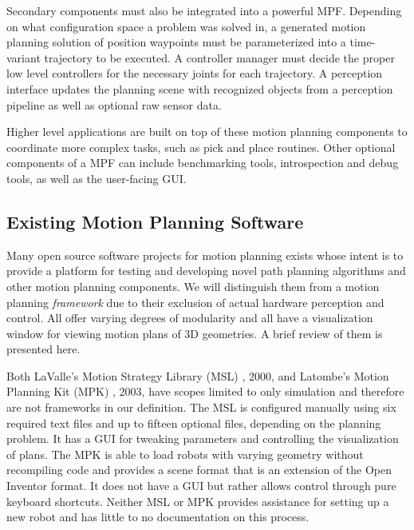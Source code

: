 \documentclass[10pt,journal,compsoc]{joser1}
\begin{document}
{Secondary components must also be integrated into a powerful MPF. Depending on what configuration space a problem was solved in, a generated motion planning solution of position waypoints must be parameterized into a time-variant trajectory to be executed. A controller manager must decide the proper low level controllers for the necessary joints for each trajectory. A perception interface updates the planning scene with recognized objects from a perception pipeline as well as optional raw sensor data.

Higher level applications are built on top of these motion planning components to coordinate more complex tasks, such as pick and place routines. Other optional components of a MPF can include benchmarking tools, introspection and debug tools, as well as the user-facing GUI.

\subsection{Existing Motion Planning Software}
\label{sec::existing}

Many open source software projects for motion planning exists whose intent is to provide a platform for testing and developing novel path planning algorithms and other motion planning components. We will distinguish them from a motion planning \textit{framework} due to their exclusion of actual hardware perception and control. All offer varying degrees of modularity and all have a visualization window for viewing motion plans of 3D geometries. A brief review of them is presented here.

Both LaValle's Motion Strategy Library (MSL) \cite{lavallemsl}, 2000, and Latombe's Motion Planning Kit (MPK) \cite{mpk}, 2003, have scopes limited to only simulation and therefore are not frameworks in our definition. The MSL is configured manually using six required text files and up to fifteen optional files, depending on the planning problem. It has a GUI for tweaking parameters and controlling the visualization of plans. The MPK is able to load robots with varying geometry without recompiling code and provides a scene format that is an extension of the Open Inventor format. It does not have a GUI but rather allows control through pure keyboard shortcuts. Neither MSL or MPK provides assistance for setting up a new robot and has little to no documentation on this process.

}
\end{document}
